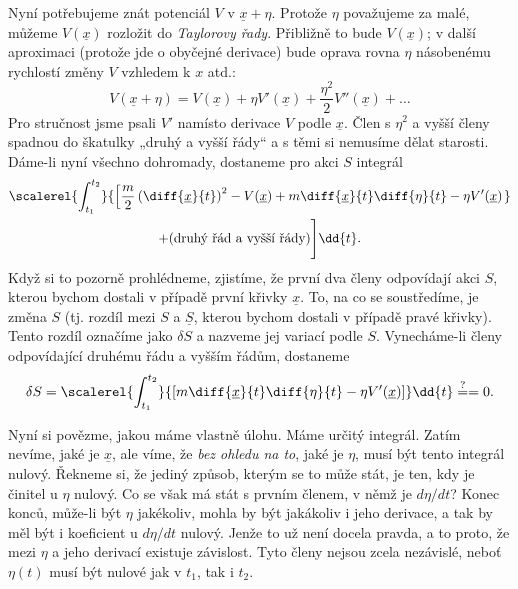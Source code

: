     Nyní potřebujeme znát potenciál \(V\) v \(\underline{x}+\eta\). Protože \(\eta\) považujeme za
    malé, můžeme \(V(\underline{x})\) rozložit do \emph{Taylorovy řady}. Přibližně to bude
    \(V(\underline{x})\); v další aproximaci (protože jde o obyčejné derivace) bude oprava rovna
    \(\eta\) násobenému rychlostí změny \(V\) vzhledem k \(x\) atd.:
    \begin{equation*}
      V(\underline{x}+\eta) = V(\underline{x}) + \eta V'(\underline{x})
      + \dfrac{\eta^2}{2} V''(\underline{x}) + \ldots
    \end{equation*}
    Pro stručnost jsme psali \(V'\) namísto derivace \(V\) podle \(\underline{x}\). Člen s
    \(\eta^2\) a vyšší členy spadnou do škatulky „druhý a vyšší řády“ a s těmi si nemusíme dělat
    starosti. Dáme-li nyní všechno dohromady, dostaneme pro akci \(S\) integrál
    \begin{multline*}
      \scalerel{\int_{t_1}^{t_2}}{
        \left[
            \frac{m}{2}\left(\diff{\underline{x}}{t}\right)^2-V(\underline{x}) 
            + m\diff{\underline{x}}{t}\diff{\eta}{t} - \eta V'(\underline{x}) 
        \right.}        \\
            + (\text{druhý řád a vyšší řády})
        \Bigg]
      \dd{t}.
    \end{multline*}
    Když si to pozorně prohlédneme, zjistíme, že první dva členy odpovídají akci \(S\), kterou
    bychom dostali v případě první křivky \(\underline{x}\). To, na co se soustředíme, je změna
    \(S\) (tj. rozdíl mezi \(S\) a \(\underline{S}\), kterou bychom dostali v případě pravé křivky).
    Tento rozdíl označíme jako \(\delta S\) a nazveme jej variací podle \(S\). Vynecháme-li členy
    odpovídající druhému řádu a vyšším řádům, dostaneme
    \begin{equation*}
      \delta S  = \scalerel{\int_{t_1}^{t_2}}{
                    \left[m\diff{\underline{x}}{t}\diff{\eta}{t} - \eta V'(\underline{x})\right]
        }\dd{t} \stackrel{?}{=} = 0.
    \end{equation*}  
    
    Nyní si povězme, jakou máme vlastně úlohu. Máme určitý integrál. Zatím nevíme, jaké je
    \(\underline{x}\), ale víme, že \emph{bez ohledu na to}, jaké je \(\eta\), musí být tento
    integrál nulový. Řekneme si, že jediný způsob, kterým se to může stát, je ten, kdy je činitel u
    \(\eta\) nulový. Co se však má stát s prvním členem, v němž je \(d\eta/dt\)? Konec konců,
    může-li být \(\eta\) jakékoliv, mohla by být jakákoliv i jeho derivace, a tak by měl být i
    koeficient u \(d\eta/dt\) nulový. Jenže to už není docela pravda, a to proto, že mezi \(\eta\) a
    jeho derivací existuje závislost. Tyto členy nejsou zcela nezávislé, neboť \(\eta(t)\) musí být
    nulové jak v \(t_1\), tak i \(t_2\).

